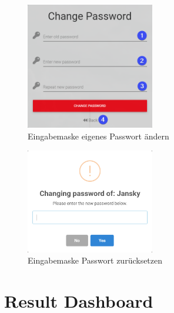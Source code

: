 \begin{figure}[H]
	\centering
	\includegraphics[width=0.5\textwidth, keepaspectratio]{img/guide/ChangeOwnPassword.png}
	\captionsetup{justification=centering, format=plain}
	\caption[Eingabemaske eigenes Passwort ändern]{Eingabemaske eigenes Passwort ändern \\\quelleScreenshot}
	\label{fig:ChangeOwnPassword}
\end{figure}

\begin{figure}[H]
	\centering
	\includegraphics[width=0.5\textwidth, keepaspectratio]{img/guide/ChangePassword.png}
	\captionsetup{justification=centering, format=plain}
	\caption[Eingabemaske Passwort zurücksetzen]{Eingabemaske Passwort zurücksetzen \\\quelleScreenshot}
	\label{fig:ChangePasswordOfUser}
\end{figure}

\section{Result Dashboard}
\label{ssec:ResultDashboard}

